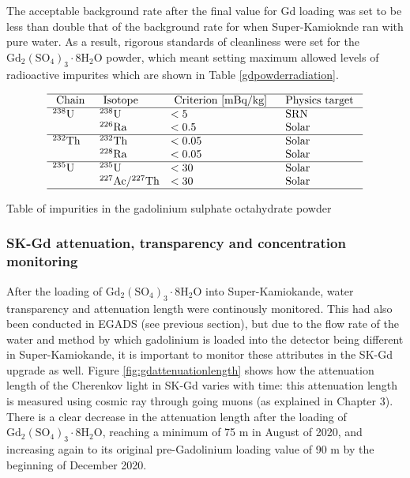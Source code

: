 The acceptable background rate after the final value for Gd loading  was set to be less than double that of the background rate for when Super-Kamioknde ran with pure water. As a result, rigorous standards of cleanliness were set for the $\mathrm{Gd}_{2}\left(\mathrm{SO}_{4}\right)_{3} \cdot 8 \mathrm{H}_{2} \mathrm{O}$ powder, which meant setting maximum allowed levels of radioactive impurites which are shown in Table \ref{gdpowderradiation}.


\begin{table}[H]

    $$
    \begin{array}{llll}
    \hline \text { Chain } & \text { Isotope } & \text { Criterion [mBq/kg] } & \text { Physics target } \\
        \hline{ }^{238} \mathrm{U} & { }^{238} \mathrm{U} & <5 & \text { SRN } \\
    & { }^{226} \mathrm{Ra} & <0.5 & \text { Solar } \\
    \hline{ }^{232} \mathrm{Th} & { }^{232} \mathrm{Th} & <0.05 & \text { Solar } \\
    & { }^{228} \mathrm{Ra} & <0.05 & \text { Solar } \\
    \hline{ }^{235} \mathrm{U} & { }^{235} \mathrm{U} & <30 & \text { Solar } \\
    & { }^{227} \mathrm{Ac} /{ }^{227} \mathrm{Th} & <30 & \text { Solar } \\
    \hline
    \end{array}
    $$
\caption{Table of impurities in the gadolinium sulphate octahydrate powder}
\label{gdpowderradiation}
\end{table}

\subsubsection{SK-Gd attenuation, transparency and concentration monitoring}

After the loading of $\mathrm{Gd}_{2}\left(\mathrm{SO}_{4}\right)_{3} \cdot 8 \mathrm{H}_{2} \mathrm{O}$ into Super-Kamiokande, water transparency and attenuation length were continously monitored. This had also been conducted in EGADS (see previous section), but due to the flow rate of the water and method by which gadolinium is loaded into the detector being different in Super-Kamiokande, it is important to monitor these attributes in the SK-Gd upgrade as well. Figure \ref{fig:gdattenuationlength} shows how the attenuation length of the Cherenkov light in SK-Gd varies with time: this attenuation length is measured using cosmic ray through going muons (as explained in Chapter 3). There is a clear decrease in the attenuation length after the loading of $\mathrm{Gd}_{2}\left(\mathrm{SO}_{4}\right)_{3} \cdot 8 \mathrm{H}_{2} \mathrm{O}$, reaching a minimum of 75 m in August of 2020, and increasing again to its original pre-Gadolinium loading value of 90 m by the beginning of December 2020.  

